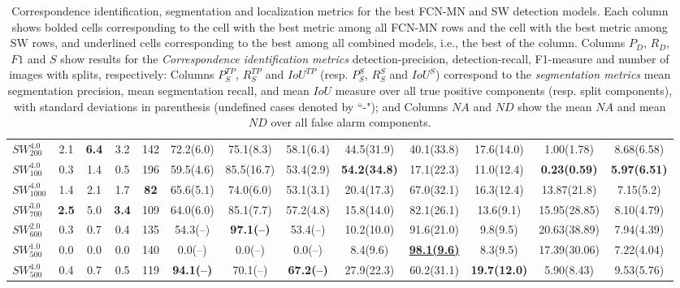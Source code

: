 \documentclass[a4paper,authoryear,review]{elsarticle}
\begin{document}
\begin{table}[]
\begin{adjustbox}{angle=90}
{\begin{tabular}{lcccccccccccc}
					\textbf{$SW_{200}^{4.0}$} & 2.1 & \textbf{6.4} & 3.2 & 142 & 72.2(6.0) & 75.1(8.3) & 58.1(6.4) & 44.5(31.9) & 40.1(33.8) & 17.6(14.0) & 1.00(1.78) & 8.68(6.58) \\
					\textbf{$SW_{100}^{4.0}$} & 0.3 & 1.4 & 0.5 & 196 & 59.5(4.6) & 85.5(16.7) & 53.4(2.9) & \textbf{54.2(34.8)} & 17.1(22.3) & 11.0(12.4) & \textbf{0.23(0.59)} & \textbf{5.97(6.51)} \\
					\textbf{$SW_{1000}^{4.0}$} & 1.4 & 2.1 & 1.7 & \textbf{82} & 65.6(5.1) & 74.0(6.0) & 53.1(3.1) & 20.4(17.3) & 67.0(32.1) & 16.3(12.4) & 13.87(21.8) & 7.15(5.2) \\
					\textbf{$SW_{700}^{3.0}$} & \textbf{2.5} & 5.0 & \textbf{3.4} & 109 & 64.0(6.0) & 85.1(7.7) & 57.2(4.8) & 15.8(14.0) & 82.1(26.1) & 13.6(9.1) & 15.95(28.85) & 8.10(4.79) \\
					\textbf{$SW_{600}^{2.0}$} & 0.3 & 0.7 & 0.4 & 135 & 54.3(--) & \textbf{97.1(--)} & 53.4(--) & 10.2(10.0) & 91.6(21.0) & 9.8(9.5) & 20.63(38.89) & 7.94(4.39) \\
					\textbf{$SW_{500}^{1.0}$} & 0.0 & 0.0 & 0.0 & 140 & 0.0(--) & 0.0(--) & 0.0(--) & 8.4(9.6) & {\ul \textbf{98.1(9.6)}} & 8.3(9.5) & 17.39(30.06) & 7.22(4.04) \\
					\textbf{$SW_{500}^{4.0}$} & 0.4 & 0.7 & 0.5 & 119 & \textbf{94.1(--)} & 70.1(--) & \textbf{67.2(--)} & 27.9(22.3) & 60.2(31.1) & \textbf{19.7(12.0)} & 5.90(8.43) & 9.53(5.76) \\ \hline
				\end{tabular}
			}
		\end{adjustbox}
		\caption{
			Correspondence identification, segmentation and localization metrics for the best FCN-MN and SW detection models. Each column shows bolded cells corresponding to the cell with the best metric among all FCN-MN rows and the cell with the best metric among SW rows, and underlined cells corresponding to the best among all combined models, i.e., the best of the column. Columns $P_D$, $R_D$, $F1$ and $S$ show results for the \emph{Correspondence identification metrics} detection-precision, detection-recall, F1-measure and number of images with splits, respectively: Columns $P_S^{TP}$, $R_S^{TP}$ and $IoU^{TP}$ (resp. $P_S^S$, $R_S^S$ and $IoU^S$) correspond to the \emph{segmentation metrics} mean segmentation precision, mean segmentation recall, and mean $IoU$ measure over all true positive components (resp. split components), with standard deviations in parenthesis (undefined cases denoted by ``-"); and Columns $NA$ and $ND$ show the mean $NA$ and mean $ND$ over all false alarm components. 
		}
		\label{tab:Table3}
	\end{table}
	
\end{document}
